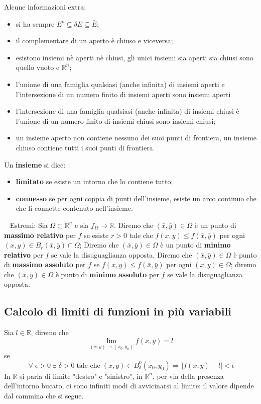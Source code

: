 Alcune informazioni extra: 
\begin{itemize}
    \item si ha sempre $E^o \subseteq \delta E \subseteq \bar{E}$;
    \item il complementare di un aperto è chiuso e viceversa; 
    \item esistono insiemi nè aperti nè chiusi, gli unici insiemi sia aperti sia chiusi sono quello vuoto e $\mathbb{R}^n$;
    \item l'unione di una famiglia qualsiasi (anche infinita) di insiemi aperti e l'intersezione di un numero finito di insiemi aperti sono insiemi aperti 
    \item l'intersezione di una famiglia qualsiasi (anche infinita) di insiemi chiusi è l'unione di un numero finito di insiemi chiusi sono insiemi chiusi;
    \item un insieme aperto non contiene nessuno dei suoi punti di frontiera, un insieme chiuso contiene tutti i suoi punti di frontiera.
\end{itemize}
Un \textbf{insieme} si dice:
\begin{itemize}
    \item \textbf{limitato} se esiste un intorno che lo contiene tutto;
    \item \textbf{connesso} se per ogni coppia di punti dell'insieme, esiste un arco continuo che che li connette contenuto nell'insieme.
\end{itemize}
\ \newline
Estremi:\newline
Sia $\Omega \subset \mathbb{R}^n$ e sia $f_\Omega \rightarrow \mathbb{R}$. Diremo che $(\bar{x}, \bar{y}) \in \Omega$ è un punto di \textbf{massimo relativo} per $f$ se esiste $r > 0$ tale che $f(x,y) \leq f(\bar{x},\bar{y})$ per ogni $(x,y) \in B_r(\bar{x},\bar{y}) \cap \Omega$; Diremo che $(\bar{x},\bar{y}) \in \Omega$ è un punto di \textbf{minimo relativo} per $f$ se vale la disuguaglianza opposta. Diremo che $(\bar{x},\bar{y}) \in \Omega$ è punto di \textbf{massimo assoluto} per $f$ se $f(x,y)\leq f(\bar{x},\bar{y})$ per ogni $(x,y) \in \Omega$; diremo che $(\bar{x},\bar{y}) \in \Omega$ è punto di \textbf{minimo assoluto} per $f$ se vale la disuguaglianza opposta.
\subsection{Calcolo di limiti di funzioni in più variabili}
Sia $l \in \mathbb{R}$, diremo che
\[
    \lim_{(x,y) \rightarrow (x_0,y_0)} f(x,y) = l
\]
se 
\[
    \;\forall\; \epsilon > 0 \; \exists \; \delta > 0 \; \text{tale che}\; (x,y) \in B_\delta^0 (x_0,y_0) \Rightarrow |f(x,y)-l| < \epsilon 
\]
In $\mathbb{R}$ si parla di limite "destro" e "sinistro", in $\mathbb{R}^n$, per via della presenza dell'intorno bucato, ci sono infiniti modi di avvicinarsi al limite: il valore dipende dal cammina che si segue.
